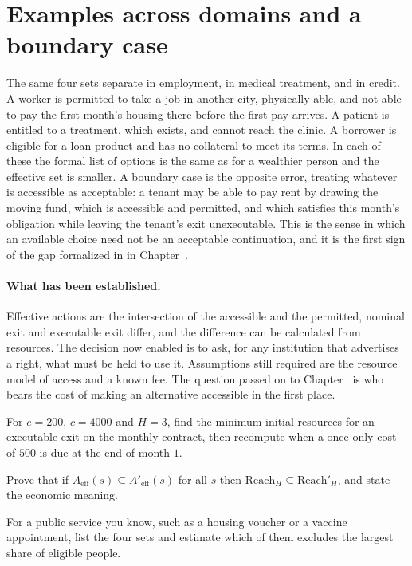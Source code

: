 \section{Examples across domains and a boundary case}

The same four sets separate in employment, in medical treatment, and in credit. A worker is permitted to take a job in another city, physically able, and not able to pay the first month's housing there before the first pay arrives. A patient is entitled to a treatment, which exists, and cannot reach the clinic. A borrower is eligible for a loan product and has no collateral to meet its terms. In each of these the formal list of options is the same as for a wealthier person and the effective set is smaller. A boundary case is the opposite error, treating whatever is accessible as acceptable: a tenant may be able to pay rent by drawing the moving fund, which is accessible and permitted, and which satisfies this month's obligation while leaving the tenant's exit unexecutable. This is the sense in which an available choice need not be an acceptable continuation, and it is the first sign of the gap formalized in  in Chapter~.

\paragraph{What has been established.} Effective actions are the intersection of the accessible and the permitted, nominal exit and executable exit differ, and the difference can be calculated from resources. The decision now enabled is to ask, for any institution that advertises a right, what must be held to use it. Assumptions still required are the resource model of access and a known fee. The question passed on to Chapter~ is who bears the cost of making an alternative accessible in the first place.

\begin{exercise}
For $e=200$, $c=4000$ and $H=3$, find the minimum initial resources for an executable exit on the monthly contract, then recompute when a once-only cost of $500$ is due at the end of month $1$.
\end{exercise}
\begin{exercise}
Prove that if $A_{\mathrm{eff}}(s)\subseteq A'_{\mathrm{eff}}(s)$ for all $s$ then $\mathrm{Reach}_H\subseteq\mathrm{Reach}'_H$, and state the economic meaning.
\end{exercise}
\begin{exercise}
For a public service you know, such as a housing voucher or a vaccine appointment, list the four sets and estimate which of them excludes the largest share of eligible people.
\end{exercise}

